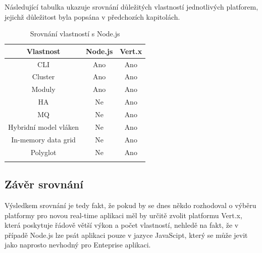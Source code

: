 Následující tabulka ukazuje srovnání důležitých vlastností jednotlivých platforem, jejichž důležitost byla popsána v předchozích kapitolách.

\begin{flushleft}
\begin{longtable}{|c|c|c|}
\hline
\textsf{\textbf{Vlastnost}} & \textsf{\textbf{Node.js}} & \textsf{\textbf{Vert.x}}\tabularnewline
\hline
CLI & Ano & Ano\tabularnewline
\hline 
Cluster & Ano & Ano\tabularnewline
\hline
Moduly & Ano & Ano\tabularnewline
\hline 
HA & Ne & Ano\tabularnewline
\hline
MQ & Ne & Ano\tabularnewline
\hline 
Hybridní model vláken & Ne & Ano\tabularnewline
\hline 
In-memory data grid & Ne & Ano\tabularnewline
\hline 
Polyglot & Ne & Ano\tabularnewline
\hline
\caption{Srovnání vlastností s Node.js}
\end{longtable}
\par\end{flushleft}

\subsection{Závěr srovnání}

Výsledkem srovnání je tedy fakt, že pokud by se dnes někdo rozhodoval o výběru platformy pro novou real-time aplikaci měl by určitě zvolit platformu Vert.x, která poskytuje řádově větší výkon a počet vlastností, nehledě na fakt, že v případě Node.js lze psát aplikaci pouze v jazyce JavaScipt, který se může jevit jako naprosto nevhodný pro Enteprise aplikaci.